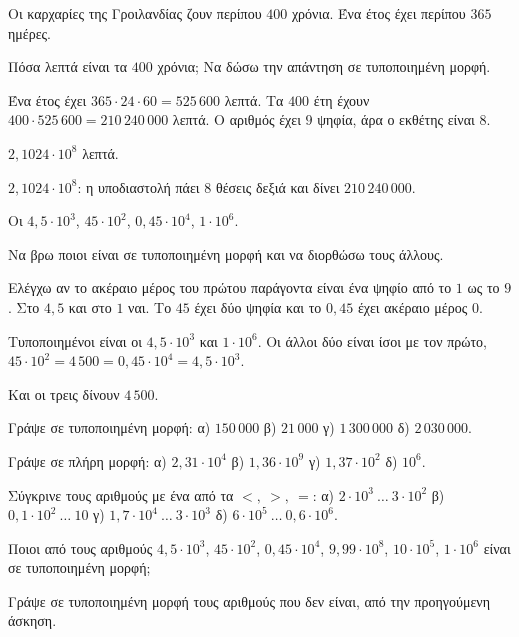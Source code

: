 \tixero Οι καρχαρίες της Γροιλανδίας ζουν περίπου $400$ χρόνια. Ένα έτος έχει περίπου $365$ ημέρες.\par
\tithelo Πόσα λεπτά είναι τα $400$ χρόνια; Να δώσω την απάντηση σε τυποποιημένη μορφή.\par
\possindeo Ένα έτος έχει $365\cdot24\cdot60=525\,600$ λεπτά. Τα $400$ έτη έχουν $400\cdot525\,600=210\,240\,000$ λεπτά. Ο αριθμός έχει $9$ ψηφία, άρα ο εκθέτης είναι $8$.\par
\apantisi $2{,}1024\cdot10^{8}$ λεπτά.\par
\elegxos $2{,}1024\cdot10^8$: η υποδιαστολή πάει $8$ θέσεις δεξιά και δίνει $210\,240\,000$.

\tixero Οι $4{,}5\cdot10^{3}$, $45\cdot10^{2}$, $0{,}45\cdot10^{4}$, $1\cdot10^{6}$.\par
\tithelo Να βρω ποιοι είναι σε τυποποιημένη μορφή και να διορθώσω τους άλλους.\par
\possindeo Ελέγχω αν το ακέραιο μέρος του πρώτου παράγοντα είναι ένα ψηφίο από το $1$ ως το $9$. Στο $4{,}5$ και στο $1$ ναι. Το $45$ έχει δύο ψηφία και το $0{,}45$ έχει ακέραιο μέρος $0$.\par
\apantisi Τυποποιημένοι είναι οι $4{,}5\cdot10^{3}$ και $1\cdot10^{6}$. Οι άλλοι δύο είναι ίσοι με τον πρώτο, $45\cdot10^2=4\,500=0{,}45\cdot10^4=4{,}5\cdot10^3$.\par
\elegxos Και οι τρεις δίνουν $4\,500$.



\ex Γράψε σε τυποποιημένη μορφή: α) $150\,000$ \quad β) $21\,000$ \quad γ) $1\,300\,000$ \quad δ) $2\,030\,000$.

\ex Γράψε σε πλήρη μορφή: α) $2{,}31\cdot10^{4}$ \quad β) $1{,}36\cdot10^{9}$ \quad γ) $1{,}37\cdot10^{2}$ \quad δ) $10^{6}$.

\ex Σύγκρινε τους αριθμούς με ένα από τα $<,\ >,\ =$: α) $2\cdot10^{3}\ \ldots\ 3\cdot10^{2}$ \quad β) $0{,}1\cdot10^{2}\ \ldots\ 10$ \quad γ) $1{,}7\cdot10^{4}\ \ldots\ 3\cdot10^{3}$ \quad δ) $6\cdot10^{5}\ \ldots\ 0{,}6\cdot10^{6}$.

\ex Ποιοι από τους αριθμούς $4{,}5\cdot10^{3}$, $45\cdot10^{2}$, $0{,}45\cdot10^{4}$, $9{,}99\cdot10^{8}$, $10\cdot10^{5}$, $1\cdot10^{6}$ είναι σε τυποποιημένη μορφή;

\ex Γράψε σε τυποποιημένη μορφή τους αριθμούς που δεν είναι, από την προηγούμενη άσκηση.

